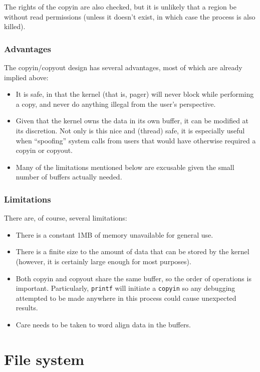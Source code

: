 \documentclass[12pt,english]{article}
\begin{document}
The rights of the copyin are also checked, but it is unlikely that a region be without read permissions (unless it doesn't exist, in which case the process is also killed).

\subsubsection{Advantages}

The copyin/copyout design has several advantages, most of which are already implied above:
\begin{itemize}
\item It is safe, in that the kernel (that is, pager) will never block while performing a copy, and never do anything illegal from the user's perspective.
\item Given that the kernel owns the data in its own buffer, it can be modified at its discretion.  Not only is this nice and (thread) safe, it is especially useful when ``spoofing'' system calls from users that would have otherwise required a copyin or copyout.
\item Many of the limitations mentioned below are excusable given the small number of buffers actually needed.
\end{itemize}

\subsubsection{Limitations}

There are, of course, several limitations:
\begin{itemize}
\item There is a constant 1MB of memory unavailable for general use.
\item There is a finite size to the amount of data that can be stored by the kernel (however, it is certainly large enough for most purposes).
\item Both copyin and copyout share the same buffer, so the order of operations is important.  Particularly, \texttt{printf} will initiate a \texttt{copyin} so any debugging attempted to be made anywhere in this process could cause unexpected results.
\item Care needs to be taken to word align data in the buffers.
\end{itemize}



\newpage{}
\section{File system} \label{vfs}
\end{document}
